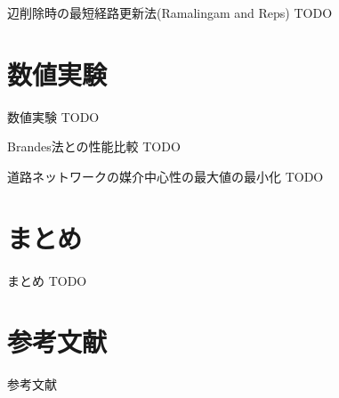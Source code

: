 \documentclass[dvipdfmx,fleqn]{beamer}
\begin{document}
\begin{frame}{辺削除時の最短経路更新法(Ramalingam and Reps)}
  \alert{TODO}
\end{frame}

\section{数値実験}
\begin{frame}{数値実験}
  \alert{TODO}
\end{frame}

\begin{frame}{Brandes法との性能比較}
  \alert{TODO}
\end{frame}

\begin{frame}{道路ネットワークの媒介中心性の最大値の最小化}
  \alert{TODO}
\end{frame}

\section{まとめ}
\begin{frame}{まとめ}
  \alert{TODO}
\end{frame}

\appendix
\section{参考文献}
\begin{frame}[allowframebreaks]{参考文献}
  \nocite{01Watts1998}
  \nocite{02Barabasi1999}
  \nocite{03Beauchamp1965}
  \nocite{04Bonacich1991}
  \nocite{05Freeman1977}
  \nocite{06Brandes2001}
  \nocite{07Puzis2012}
  \nocite{08Bentert2018}
  \nocite{09Erdos2015}
  \nocite{10Bader2006}
  \nocite{11Tan2009}
  \nocite{12Edmonds2010}
  \nocite{13Bernaschi2016}
  \nocite{14Brandes2007}
  \nocite{15Bader2007}
  \nocite{16Pfeffer2012}
  \nocite{17Yoshida2014}
  \nocite{18Holme2012}
  \nocite{19Lee2012}
  \nocite{20Singh2015}
  \nocite{21Hayashi2015}
  \nocite{22Bergamini2015a}
  \nocite{23Bergamini2015b}
  \nocite{24Ramalingam1996}
  \nocite{25Kas2013}
  \nocite{26Karger1993}
  \nocite{27Nasre2014a}
  \nocite{28Demetrescu2003}
  \nocite{29Nasre2014b}
  \nocite{30Pontecorvi2015}
  \nocite{31Bergamini2017}
  \nocite{32Leskovec2016}
  \nocite{33Rozemberczki2019b}
  \nocite{34OpenStreetMap}
  \printbibliography[title=]
\end{frame}
\end{document}
